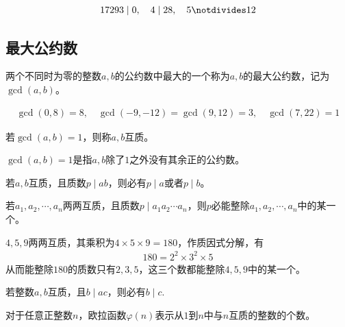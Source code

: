 \begin{example}
  \begin{align*}
    17293\mid 0,\quad 4\mid 28,\quad 5\notdivides 12
  \end{align*}
\end{example}

\subsection{最大公约数}
\label{sec:gcd}

\begin{definition}
  两个不同时为零的整数$a,b$的公约数中最大的一个称为$a,b$的最大公约数，记为$\gcd(a,b)$。
\end{definition}

\begin{example}
  \begin{align*}
    \gcd(0,8)=8,\quad 
    \gcd(-9,-12)=\gcd(9,12)=3,\quad
    \gcd(7,22)=1
  \end{align*}
\end{example}

\begin{definition}[互质，Coprime]
  若$\gcd(a,b)=1$，则称$a,b$互质。
\end{definition}
$\gcd(a,b)=1$是指$a,b$除了$1$之外没有其余正的公约数。

\begin{theorem}
  若$a,b$互质，且质数$p\mid ab$，则必有$p\mid a$或者$p\mid b$。
\end{theorem}
\begin{corollary}
  若$a_1,a_2,\cdots,a_n$两两互质，且质数$p\mid a_1a_2\cdots a_n$，则$p$必能整除$a_1,a_2,\cdots, a_n$中的某一个。
\end{corollary}

\begin{example}
  $4,5,9$两两互质，其乘积为$4\times5\times9=180$，作质因式分解，有
  \begin{align*}
    180=2^2\times 3^2\times 5
  \end{align*}
  从而能整除$180$的质数只有$2,3,5$，这三个数都能整除$4,5,9$中的某一个。
\end{example}

\begin{theorem}
  若整数$a,b$互质，且$b\mid ac$，则必有$b\mid c.$
\end{theorem}

\begin{definition}\label{def:Euler-function}
  对于任意正整数$n$，欧拉函数$\varphi(n)$表示从$1$到$n$中与$n$互质的整数的个数。
\end{definition}

